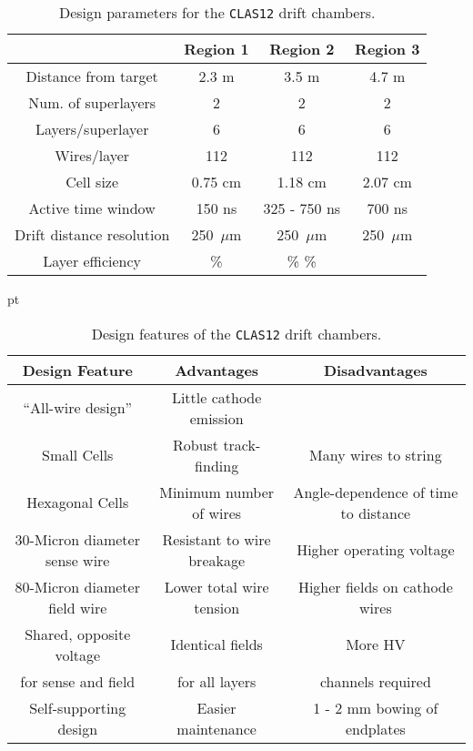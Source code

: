 \small{
\begin{table}[ht]
\begin{center}
\begin{tabular}{||c|c|c|c||} \hline \hline
            &{\bf Region 1}&{\bf Region 2}&{\bf Region 3}\\ \hline
Distance from target & 2.3 m    & 3.5 m        & 4.7 m    \\ \hline
Num. of superlayers  & 2        & 2            & 2        \\ \hline
Layers/superlayer    & 6        & 6            & 6        \\ \hline
Wires/layer          & 112      & 112          & 112      \\ \hline
Cell size            & 0.75 cm  & 1.18 cm      & 2.07 cm  \\ \hline
Active time window   & 150 ns   & 325 - 750 ns & 700 ns   \\ \hline
Drift distance resolution   & 250~$\mu$m   & 250~$\mu$m &250~$\mu$m  \\ \hline
Layer efficiency   & \> 95\%   & \> 95\% \> 95\%   \\ \hline
\end{tabular}
\caption{\small{Design parameters for the {\tt CLAS12} drift chambers.}}
\label{fwd-dc-design-parms}
\end{center}
\end{table}
}

 pt

\begin{table}[ht]
\begin{center}
\begin{tabular} {||c|c|c||} \hline \hline
{\bf Design Feature  }       &{\bf Advantages} &{\bf Disadvantages}\\ \hline
``All-wire design'' & Little cathode emission & \\ \hline
Small Cells & Robust track-finding  & Many wires to string \\ \hline
Hexagonal Cells & Minimum number of wires  & Angle-dependence of time to distance  \\ \hline
30-Micron diameter sense wire & Resistant to wire breakage & Higher operating voltage \\ \hline
80-Micron diameter field wire & Lower total wire tension & Higher fields on cathode wires \\ \hline
Shared, opposite voltage  & Identical fields & More HV \\
for sense and field & for all layers & channels required \\ \hline
Self-supporting design & Easier maintenance & 1 - 2 mm bowing of endplates \\ \hline
\end{tabular}
\caption{\small{Design features of the {\tt CLAS12} drift chambers.}}
\label{fwd-dc-design-features}
\end{center}
\end{table}

